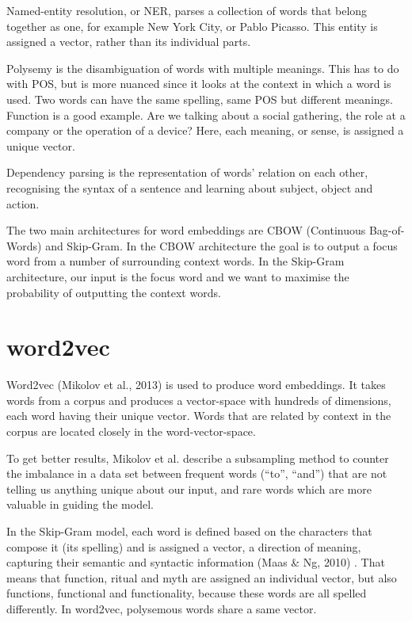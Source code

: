 \documentclass[12pt, usenames, dvipsnames]{report}
\begin{document}
\begin{flushleft}
Named-entity resolution, or NER, parses a collection of words that belong together as one, for example New York City, or Pablo Picasso.
This entity is assigned a vector, rather than its individual parts.

Polysemy is the disambiguation of words with multiple meanings.
This has to do with POS, but is more nuanced since it looks at the context in which a word is used.
Two words can have the same spelling, same POS but different meanings.
Function is a good example.
Are we talking about a social gathering, the role at a company or the operation of a device? Here, each meaning, or sense, is assigned a unique vector.

Dependency parsing is the representation of words’ relation on each other, recognising the syntax of a sentence and learning about subject, object and action.

The two main architectures for word embeddings are CBOW (Continuous Bag-of-Words) and Skip-Gram.
In the CBOW architecture the goal is to output a focus word from a number of surrounding context words.
In the Skip-Gram architecture, our input is the focus word and we want to maximise the probability of outputting the context words.


\section{word2vec}

Word2vec (Mikolov et al., 2013) \cite{mikolov2013} is used to produce word embeddings.
It takes words from a corpus and produces a vector-space with hundreds of dimensions, each word having their unique vector.
Words that are related by context in the corpus are located closely in the word-vector-space.

To get better results, Mikolov et al. describe a subsampling method to counter the imbalance in a data set between frequent words (“to”, “and”) that are not telling us anything unique about our input, and rare words which are more valuable in guiding the model.

In the Skip-Gram model, each word is defined based on the characters that compose it (its spelling) and is assigned a vector, a direction of meaning, capturing their semantic and syntactic information (Maas \& Ng, 2010) \cite{maas2010}.
That means that function, ritual and myth are assigned an individual vector, but also functions, functional and functionality, because these words are all spelled differently.
In word2vec, polysemous words share a same vector.


\end{flushleft}
\end{document}
